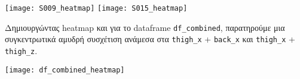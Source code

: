         \begin{multicols}{2} \centering
            \noindent\texttt{[image: S009\_heatmap]}
            \texttt{[image: S015\_heatmap]}
        \end{multicols}

        Δημιουργώντας heatmap και για το dataframe \verb|df_combined|, παρατηρούμε μια συγκεντρωτικά αμυδρή συσχέτιση
        ανάμεσα στα \verb|thigh_x| + \verb|back_x| και \verb|thigh_x| + \verb|thigh_z|.

        \vspace{-5pt}
        \begin{center}
            \texttt{[image: df\_combined\_heatmap]}
        \end{center}